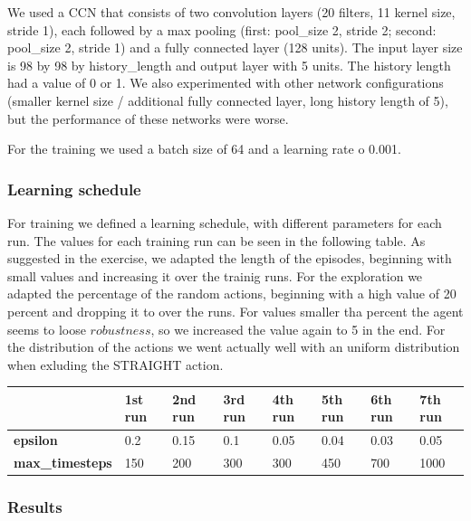 \documentclass[
        a4paper,
        10pt,
        parskip = full,    %
    ]{scrartcl}
\begin{document}
We used a CCN that consists of two convolution layers (20 filters, 11 kernel size, stride 1), each followed by a max
pooling (first: pool\_size 2, stride 2; second: pool\_size 2, stride 1) and a fully connected
layer (128 units). The input layer size is 98 by 98 by history\_length and output layer with 5 units.
The history length had a value of 0 or 1. We also experimented with other network configurations
(smaller kernel size / additional fully connected layer, long history length of 5), but the
performance of these networks were worse.

For the training we used a batch size of 64 and a learning rate o 0.001. 


\subsubsection{Learning schedule}

For training we defined a learning schedule, with different parameters for each run. The values for
each training run can be seen in the following table. As suggested in the exercise, we adapted
the length of the episodes, beginning with small values and increasing it over the trainig runs.
For the exploration we adapted the percentage of the random actions, beginning with a high value of
20 percent and dropping it to over the runs. For values smaller tha  percent the agent seems to loose
$robustness$, so we increased the value again to 5 in the end. For the distribution of the actions we
went actually well with an uniform distribution when exluding the STRAIGHT action.

\begin{center}
    \begin{tabular}{ | l | l | l | l | l | l | l | l |}
    \hline
                            & \textbf{1st run} & \textbf{2nd run} & \textbf{3rd run} &
                            \textbf{4th run} & \textbf{5th run} & \textbf{6th run} & \textbf{7th run} \\ \hline
    \textbf{epsilon}        &  0.2  &  0.15  &  0.1  &  0.05  &  0.04  &  0.03  &  0.05  \\ \hline
    \textbf{max\_timesteps} &  150  &  200   &  300  &  300   &  450   &  700   &  1000  \\ \hline
    \end{tabular}
\end{center}


\subsubsection{Results}
\end{document}
